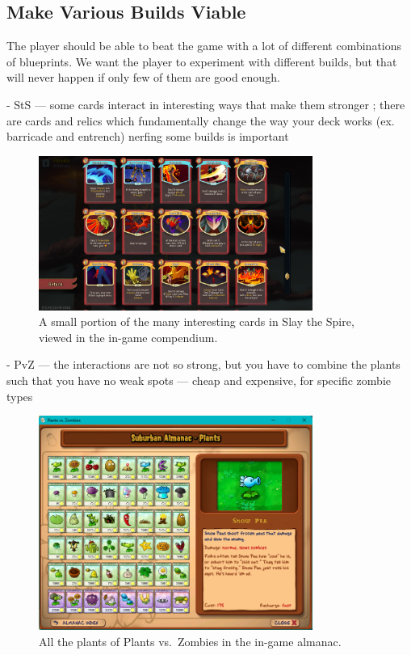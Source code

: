\subsection{Make Various Builds Viable} \label{sec:goal-various-builds}

The player should be able to beat the game with a lot of different combinations of blueprints.
We want the player to experiment with different builds, but that will never happen if only few of them are good enough.

- StS --- some cards interact in interesting ways that make them stronger ; there are cards and relics which fundamentally change the way your deck works (ex. barricade and entrench) nerfing some builds is important

\begin{figure}[htb]
    \centering
    \includegraphics[width=0.8\textwidth]{img/Slay-the-Spire-Compendium.png}
    \caption{A small portion of the many interesting cards in Slay the Spire, viewed in the in-game compendium.}
    \label{fig:slay-the-spire-compendium}
\end{figure}

- PvZ --- the interactions are not so strong, but you have to combine the plants such that you have no weak spots --- cheap and expensive, for specific zombie types

\begin{figure}[htb]
    \centering
    \includegraphics[width=0.8\textwidth]{img/Plants-vs-Zombies-Almanac.png}
    \caption{All the plants of Plants vs.\ Zombies in the in-game almanac.}
    \label{fig:plants-vs-zombies-almanac}
\end{figure}

